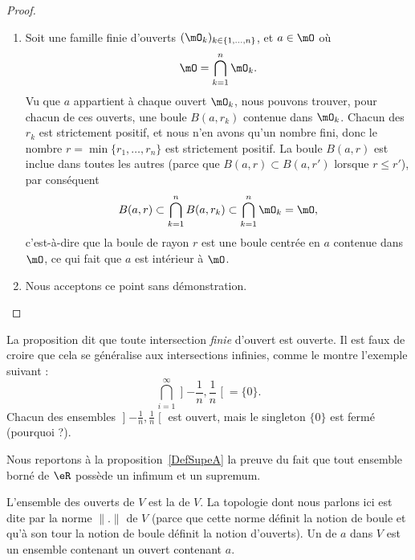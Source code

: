 \begin{proof}
\begin{enumerate}
		\item
		      Soit une famille finie d'ouverts $(\mO_k)_{k\in\{ 1,\ldots,n \}}$, et $a\in\mO$ où
		      \begin{equation}
			      \mO=\bigcap_{k=1}^n\mO_k.
		      \end{equation}
		      Vu que $a$ appartient à chaque ouvert $\mO_k$, nous pouvons trouver, pour chacun de ces ouverts, une boule $B(a,r_k)$ contenue dans $\mO_k$. Chacun des $r_k$ est strictement positif, et nous n'en avons qu'un nombre fini, donc le nombre $r=\min\{ r_1,\ldots,r_n \}$ est strictement positif. La boule $B(a,r)$ est inclue dans toutes les autres (parce que $B(a,r)\subset B(a,r')$ lorsque $r\leq r'$), par conséquent
		      \begin{equation}
			      B(a,r)\subset\bigcap_{k=1}^nB(a,r_k)\subset\bigcap_{k=1}^n\mO_k=\mO,
		      \end{equation}
		      c'est-à-dire que la boule de rayon $r$ est une boule centrée en $a$ contenue dans $\mO$, ce qui fait que $a$ est intérieur à $\mO$.
		\item
		      Nous acceptons ce point sans démonstration.
	\end{enumerate}

\end{proof}

La proposition dit que toute intersection \emph{finie} d'ouvert est ouverte. Il est faux de croire que cela se généralise aux intersections infinies, comme le montre l'exemple suivant :
\begin{equation}
	\bigcap_{i=1}^{\infty}\mathopen] -\frac{1}{ n } , \frac{1}{ n } \mathclose[=\{ 0 \}.
\end{equation}
Chacun des ensembles $\mathopen] -\frac{1}{ n } , \frac{1}{ n } \mathclose[$ est ouvert, mais le singleton $\{ 0 \}$ est fermé (pourquoi ?).

Nous reportons à la proposition~\ref{DefSupeA} la preuve du fait que tout ensemble borné de $\eR$ possède un infimum et un supremum.



\begin{definition}
	L'ensemble des ouverts de $V$ est la  de $V$. La topologie dont nous parlons ici est dite  par la norme $\| . \|$ de $V$ (parce que cette norme définit la notion de boule et qu'à son tour la notion de boule définit la notion d'ouverts). Un  de $a$ dans $V$ est un ensemble contenant un ouvert contenant $a$.
\end{definition}

